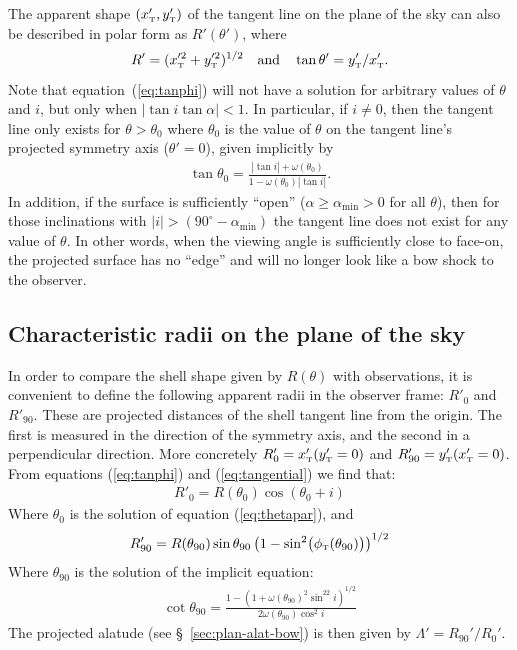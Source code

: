 The apparent shape \((x'_{\mathrm{\scriptscriptstyle T}}, y'_{\mathrm{\scriptscriptstyle T}})\) of the tangent line on the plane
of the sky can also be described in polar form as \(R'(\theta')\),
where
\begin{equation}
  \label{eq:R-prime-theta-prime}
  R' = (x'^2_{\mathrm{\scriptscriptstyle T}}+ y'^2_{\mathrm{\scriptscriptstyle T}})^{1/2} 
  \quad \text{and} \quad
  \tan\theta' = y'_{\mathrm{\scriptscriptstyle T}} / x'_{\mathrm{\scriptscriptstyle T}}.
\end{equation}
Note that equation~(\ref{eq:tanphi}) will not have
a solution for arbitrary values of $\theta$ and $i$, but only when
$|\tan i\tan\alpha|<1$. In particular, if $i\neq 0$, then the tangent
line only exists for \(\theta > \theta_{0}\) where \(\theta_{0}\) is the value of \(\theta\) on the tangent line's projected symmetry axis (\(\theta' = 0\)), 
given implicitly by
\begin{align}
\tan\theta_{0} = \frac{|\tan i| + \omega(\theta_{0})}{1-\omega(\theta_{0}) |\tan i|} . 
\label{eq:thetapar}
\end{align}
In addition, if the surface is sufficiently ``open''
(\(\alpha \ge \alpha_{\mathrm{min}} > 0\) for all \(\theta\)), then for those
inclinations with
\(\vert i\vert > (90^\circ - \alpha_{\mathrm{min}}) \) the tangent line does not exist
for any value of \(\theta\).  In other words, when the viewing angle is
sufficiently close to face-on, the projected surface has no ``edge''
and will no longer look like a bow shock to the observer.

\subsection{Characteristic radii on the plane of the sky}

In order to compare the shell shape given by $R(\theta)$ with observations,
it is convenient to define the following apparent radii in the
observer frame: $R'_{0}$ and $R'_{90}$. These are projected distances
of the shell tangent line from the origin. The first is measured in
the direction of the symmetry axis, and the second in a perpendicular
direction. More concretely $R'_{0} = x'_{\mathrm{\scriptscriptstyle T}}(y'_{\mathrm{\scriptscriptstyle T}}=0)$ and
$R'_{90} = y'_{\mathrm{\scriptscriptstyle T}}(x'_{\mathrm{\scriptscriptstyle T}}=0)$. From equations (\ref{eq:tanphi}) and
(\ref{eq:tangential}) we find that:
\begin{align}
R'_{0} = R(\theta_{0})\cos(\theta_{0} + i) \label{eq:Rpar} 
\end{align}
Where $\theta_{0}$ is the solution of equation (\ref{eq:thetapar}), and
\begin{align}
  \label{eq:R90prime}
R'_{90} = R(\theta_{90})\sin\theta_{90}\left(1-\sin^2\bigl(\phi_{\mathrm{\scriptscriptstyle T}}(\theta_{90})\bigr)\right)^{1/2}
\end{align}
Where $\theta_{90}$ is the solution of the implicit equation:
\begin{align}
  \label{eq:th90}
\cot\theta_{90} = \frac{1-\left(1+\omega(\theta_{90})^2\sin^22i\right)^{1/2}}{2\omega(\theta_{90})\cos^2 i}
\end{align}
The projected alatude (see \S~\ref{sec:plan-alat-bow}) is then given
by \(\Lambda' = R_{90}' / R_0'\).

